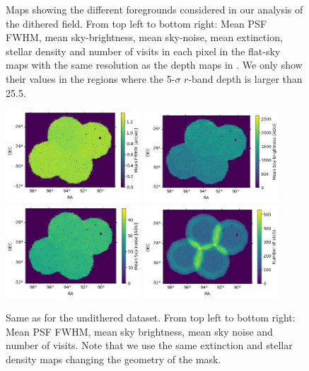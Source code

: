 \documentclass[twocolumn]{aastex62}
\begin{document}
\begin{figure}
\caption{Maps showing the different foregrounds considered in our analysis of the dithered field. From top left to bottom right: Mean PSF FWHM, mean sky-brightness, mean sky-noise, mean extinction, stellar density and number of visits in each pixel in the flat-sky maps with the same resolution as the depth maps in . We only show their values in the regions where the 5-$\sigma$ $r$-band depth is larger than 25.5.}
\label{fig:systematic_maps}
\end{figure}

\begin{figure}
\centering
\includegraphics[width=0.45\textwidth]{ud_mean_fwhm.png}
\includegraphics[width=0.45\textwidth]{ud_mean_sky.png}
\includegraphics[width=0.45\textwidth]{ud_mean_skynoise.png}
\includegraphics[width=0.45\textwidth]{ud_nvisits.png}
\caption{Same as  for the undithered dataset. From top left to bottom right: Mean PSF FWHM, mean sky brightness, mean sky noise and number of visits. Note that we use the same extinction and stellar density maps changing the geometry of the mask.}
\label{fig:systematic_maps_ud}
\end{figure}
\end{document}
